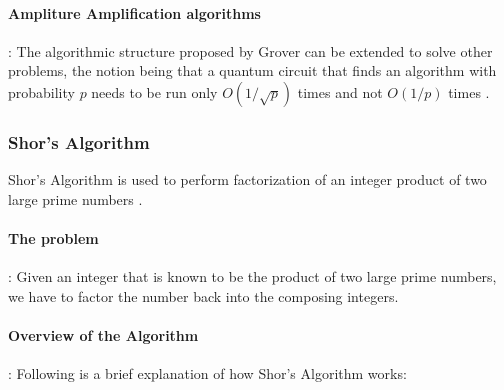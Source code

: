 \paragraph*{Ampliture Amplification algorithms}: The algorithmic structure proposed by Grover can be extended to solve other problems, the notion being that a quantum circuit that finds an algorithm with probability $p$ needs to be run only $O(1/\sqrt{p})$ times and not $O(1/p)$ times \cite{quantum-amplitude-amplification-algorithms}.

\subsubsection{Shor's Algorithm}

Shor's Algorithm is used to perform factorization of an integer product of two large prime numbers \cite{shor-quantum-algorithm-explaination}.

\paragraph*{The problem}: Given an integer that is known to be the product of two large prime numbers, we have to factor the number back into the composing integers.

\paragraph*{Overview of the Algorithm}: Following is a brief explanation of how Shor's Algorithm works:

